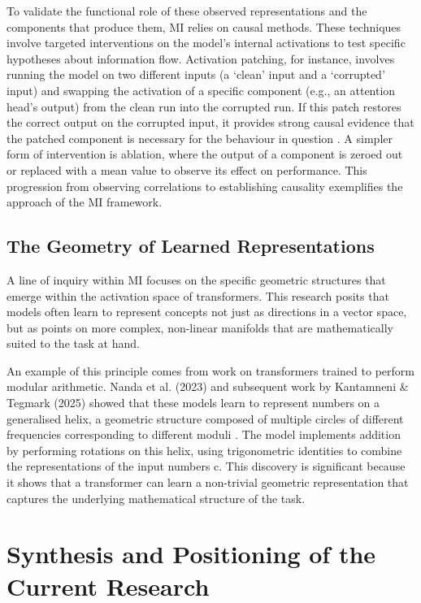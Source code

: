 To validate the functional role of these observed representations and the components that produce them, MI relies on causal methods. These techniques involve targeted interventions on the model's internal activations to test specific hypotheses about information flow. Activation patching, for instance, involves running the model on two different inputs (a `clean' input and a `corrupted' input) and swapping the activation of a specific component (e.g., an attention head's output) from the clean run into the corrupted run. If this patch restores the correct output on the corrupted input, it provides strong causal evidence that the patched component is necessary for the behaviour in question \cite{zhang2024bestpracticesactivationpatching}. A simpler form of intervention is ablation, where the output of a component is zeroed out or replaced with a mean value to observe its effect on performance. This progression from observing correlations to establishing causality exemplifies the approach of the MI framework.

\subsection{The Geometry of Learned Representations}

A line of inquiry within MI focuses on the specific geometric structures that emerge within the activation space of transformers. This research posits that models often learn to represent concepts not just as directions in a vector space, but as points on more complex, non-linear manifolds that are mathematically suited to the task at hand.

An example of this principle comes from work on transformers trained to perform modular arithmetic. Nanda et al. (2023) and subsequent work by Kantamneni \& Tegmark (2025) showed that these models learn to represent numbers on a generalised helix, a geometric structure composed of multiple circles of different frequencies corresponding to different moduli \cite{nanda2023progress, trigonometry, chughtai2023toymodel}. The model implements addition by performing rotations on this helix, using trigonometric identities to combine the representations of the input numbers \cite{trigonometry}c. This discovery is significant because it shows that a transformer can learn a non-trivial geometric representation that captures the underlying mathematical structure of the task.

\section{Synthesis and Positioning of the Current Research}

